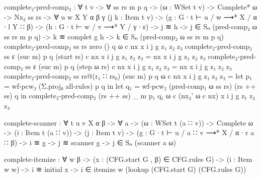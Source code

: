 		\begin{code}
			complete₂-pred-comp₂ : ∀ {t v} -> ∀ ss rs m p q ->
			  (ω : WSet t v) ->
			  Complete* ω ->
			  Nx₂ ss rs ->
			  ∀ {u w X Y α β γ}
			  (j k : Item t v) ->
			  (g : G ∙ t ⊢ u / w ⟶* X / α ∙ l Y ∷ β) ->
			  (h : G ∙ t ⊢ w / v ⟶* Y / γ ∙ ε) ->
			  j ≋ h -> j ∈ Sₙ (pred-comp₂ ω ss rs m p q) ->
			  k ≋ complet g h ->
			    k ∈ Sₙ (pred-comp₂ ω ss rs m p q)
			complete₂-pred-comp₂ ss rs            zero    () q ω           c nx x i j g z₁ z₂ z₃
			complete₂-pred-comp₂ ss ε             (suc m) p  q (start rs)  c nx x i j g z₁ z₂ z₃ =
			  nx x i j g z₁ z₂ z₃
			complete₂-pred-comp₂ ss ε             (suc m) p  q (step ω rs) c nx x i j g z₁ z₂ z₃ =
			  nx x i j g z₁ z₂ z₃
			complete₂-pred-comp₂ ss rs@(r₁ ∷ rs₀) (suc m) p  q ω           c nx x i j g z₁ z₂ z₃ =
			  let p₁ = wf-pcw₃ (Σ.proj₀ all-rules) p q in
			  let q₁ = wf-pcw₂ (pred-comp₁ ω ss rs) (rs ++ ss) q in
			  complete₂-pred-comp₂ (rs ++ ss) _ m p₁ q₁ ω c (nx₂' ω c nx) x i j g z₁ z₂ z₃
		\end{code}

		\begin{code}
			complete-scanner : ∀ {t u v X α β} -> ∀ a ->
			  (ω : WSet t (a ∷ v)) ->
			  Complete ω ->
			  (i : Item t (a ∷ v)) ->
			  (j : Item t v) ->
			  (g : G ∙ t ⊢ u / a ∷ v ⟶* X / α ∙ r a ∷ β) ->
			  i ≋ g ->
			  j ≋ scanner g ->
			    j ∈ Sₙ (scanner a ω)
		\end{code}

		\begin{code}
			complete-itemize : ∀ w {β} ->
			  (x : (CFG.start G , β) ∈ CFG.rules G) ->
			  (i : Item w w) ->
			  i ≋ initial x ->
			    i ∈ itemize w (lookup (CFG.start G) (CFG.rules G))
		\end{code}

